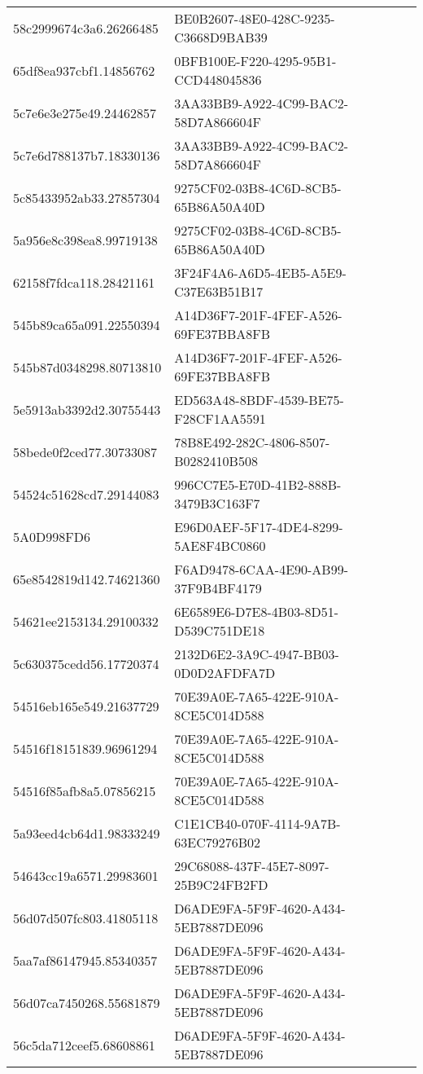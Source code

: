 \begin{tabular}{ll}
58c2999674c3a6.26266485 & BE0B2607-48E0-428C-9235-C3668D9BAB39 \\
65df8ea937cbf1.14856762 & 0BFB100E-F220-4295-95B1-CCD448045836 \\
5c7e6e3e275e49.24462857 & 3AA33BB9-A922-4C99-BAC2-58D7A866604F \\
5c7e6d788137b7.18330136 & 3AA33BB9-A922-4C99-BAC2-58D7A866604F \\
5c85433952ab33.27857304 & 9275CF02-03B8-4C6D-8CB5-65B86A50A40D \\
5a956e8c398ea8.99719138 & 9275CF02-03B8-4C6D-8CB5-65B86A50A40D \\
62158f7fdca118.28421161 & 3F24F4A6-A6D5-4EB5-A5E9-C37E63B51B17 \\
545b89ca65a091.22550394 & A14D36F7-201F-4FEF-A526-69FE37BBA8FB \\
545b87d0348298.80713810 & A14D36F7-201F-4FEF-A526-69FE37BBA8FB \\
5e5913ab3392d2.30755443 & ED563A48-8BDF-4539-BE75-F28CF1AA5591 \\
58bede0f2ced77.30733087 & 78B8E492-282C-4806-8507-B0282410B508 \\
54524c51628cd7.29144083 & 996CC7E5-E70D-41B2-888B-3479B3C163F7 \\
5A0D998FD6 & E96D0AEF-5F17-4DE4-8299-5AE8F4BC0860 \\
65e8542819d142.74621360 & F6AD9478-6CAA-4E90-AB99-37F9B4BF4179 \\
54621ee2153134.29100332 & 6E6589E6-D7E8-4B03-8D51-D539C751DE18 \\
5c630375cedd56.17720374 & 2132D6E2-3A9C-4947-BB03-0D0D2AFDFA7D \\
54516eb165e549.21637729 & 70E39A0E-7A65-422E-910A-8CE5C014D588 \\
54516f18151839.96961294 & 70E39A0E-7A65-422E-910A-8CE5C014D588 \\
54516f85afb8a5.07856215 & 70E39A0E-7A65-422E-910A-8CE5C014D588 \\
5a93eed4cb64d1.98333249 & C1E1CB40-070F-4114-9A7B-63EC79276B02 \\
54643cc19a6571.29983601 & 29C68088-437F-45E7-8097-25B9C24FB2FD \\
56d07d507fc803.41805118 & D6ADE9FA-5F9F-4620-A434-5EB7887DE096 \\
5aa7af86147945.85340357 & D6ADE9FA-5F9F-4620-A434-5EB7887DE096 \\
56d07ca7450268.55681879 & D6ADE9FA-5F9F-4620-A434-5EB7887DE096 \\
56c5da712ceef5.68608861 & D6ADE9FA-5F9F-4620-A434-5EB7887DE096 \\

\end{tabular}
